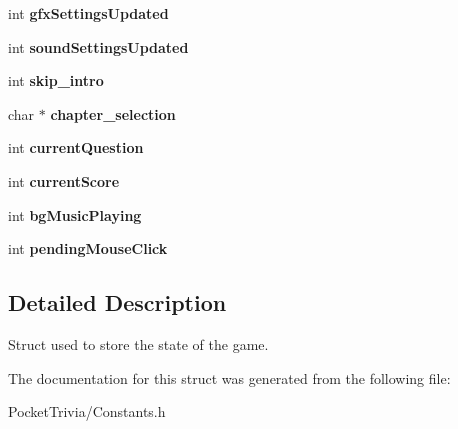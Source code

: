 \begin{DoxyCompactItemize}
int {\bfseries gfx\+Settings\+Updated}
\item 
\mbox{\label{struct_game_state_ae29fc7b3a488915b26dfea6b80311f20}} 
int {\bfseries sound\+Settings\+Updated}
\item 
\mbox{\label{struct_game_state_a840d2ddfa9cb764c7007bfc4d6f7c1d7}} 
int {\bfseries skip\+\_\+intro}
\item 
\mbox{\label{struct_game_state_adfbe260b0ed26f8c28a2a7c3de576460}} 
char $\ast$ {\bfseries chapter\+\_\+selection}
\item 
\mbox{\label{struct_game_state_a124a44c84bfd9cae93df207df25fc833}} 
int {\bfseries current\+Question}
\item 
\mbox{\label{struct_game_state_a3056e8e821620fe79eca1ecd51550538}} 
int {\bfseries current\+Score}
\item 
\mbox{\label{struct_game_state_a1411957bff9ebca2c306105478074763}} 
int {\bfseries bg\+Music\+Playing}
\item 
\mbox{\label{struct_game_state_a6ac1b15aa88e49f9a7fb7600d0ab4074}} 
int {\bfseries pending\+Mouse\+Click}
\end{DoxyCompactItemize}


\subsection{Detailed Description}
Struct used to store the state of the game. 



The documentation for this struct was generated from the following file\+:\begin{DoxyCompactItemize}
\item 
Pocket\+Trivia/Constants.\+h\end{DoxyCompactItemize}
